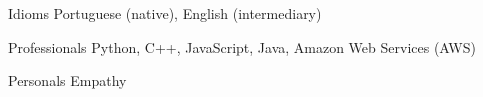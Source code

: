 
\begin{cvskills}
	\cvskill
	{Idioms}
	{Portuguese (native), English (intermediary)}

	\cvskill
	{Professionals}
	{Python, C++, JavaScript, Java, Amazon Web Services (AWS)}

	\cvskill
	{Personals}
	{Empathy}
\end{cvskills}

